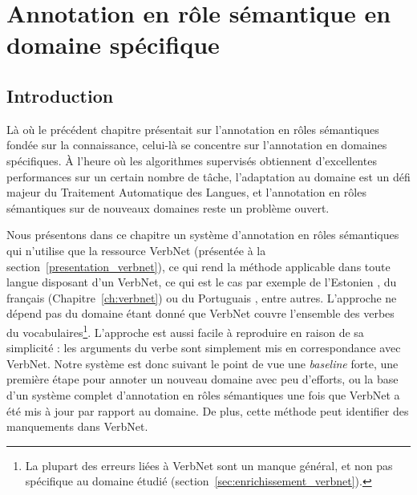 

\chapter{Annotation en rôle sémantique en domaine spécifique}
\label{ch:domainsrl}

\section{Introduction}

Là où le précédent chapitre présentait sur l'annotation en rôles sémantiques
fondée sur la connaissance, celui-là se concentre sur l'annotation en domaines
spécifiques. À l'heure où les algorithmes supervisés obtiennent d'excellentes
performances sur un certain nombre de tâche, l'adaptation au domaine est un
défi majeur du Traitement Automatique des Langues, et l'annotation en rôles
sémantiques sur de nouveaux domaines reste un problème ouvert. 

Nous présentons dans ce chapitre un système d'annotation en rôles sémantiques
qui n'utilise que la ressource VerbNet (présentée à la
section~\ref{presentation_verbnet}), ce qui rend la méthode applicable
dans toute langue disposant d'un VerbNet, ce qui est le cas par exemple de
l'Estonien \citep{jentson2014verbnet}, du français (Chapitre~\ref{ch:verbnet})
ou du Portuguais \citep{scarton2012towards}, entre autres. L'approche ne dépend
pas du domaine étant donné que VerbNet couvre l'ensemble des verbes du
vocabulaires\footnote{La plupart des erreurs liées à VerbNet sont un manque
général, et non pas spécifique au domaine étudié
(section~\ref{sec:enrichissement_verbnet}).}. L'approche est aussi facile à
reproduire en raison de sa simplicité : les arguments du verbe sont simplement
mis en correspondance avec VerbNet. Notre système est donc suivant le point de
vue une \emph{baseline} forte, une première étape pour annoter un nouveau
domaine avec peu d'efforts, ou la base d'un système complet d'annotation en
rôles sémantiques une fois que VerbNet a été mis à jour par rapport au domaine.
De plus, cette méthode peut identifier des manquements dans VerbNet.

